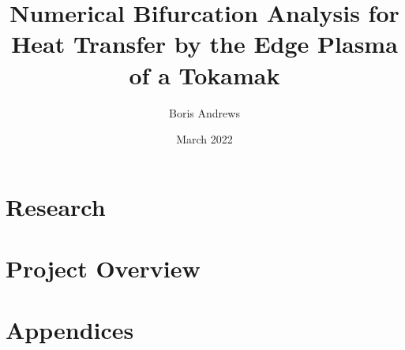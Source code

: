 \documentclass[12pt, a4paper]{report}
\title{Numerical Bifurcation Analysis for Heat Transfer by the Edge Plasma of a Tokamak}
\author{Boris Andrews}
\affil{Mathematical Institute, University of Oxford}
\date{March 2022}
\begin{document}
    \maketitle
    
    
    \begin{abstract}
    \end{abstract}
    
    
    \newpage
    \tableofcontents
    
    
    \newpage
            
        \part{Research}
            
            
            
            
        \part{Project Overview}
            
            
    
    
    \newpage
        \printbibliography


    \newpage
    \appendix
        \part{Appendices}
            
\end{document}
